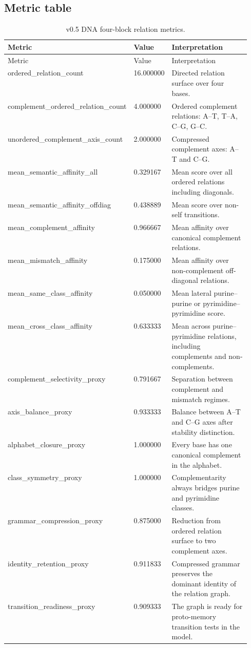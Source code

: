 \documentclass[11pt]{article}
\begin{document}
\subsection{Metric table}
\begin{longtable}{llp{0.55\linewidth}}
\caption{v0.5 DNA four-block relation metrics.}\label{tab:metrics}\\
\toprule
Metric & Value & Interpretation \\
\midrule
\endfirsthead
\toprule
Metric & Value & Interpretation \\
\midrule
\endhead
ordered\_relation\_count & 16.000000 & Directed relation surface over four bases. \\
complement\_ordered\_relation\_count & 4.000000 & Ordered complement relations: A--T, T--A, C--G, G--C. \\
unordered\_complement\_axis\_count & 2.000000 & Compressed complement axes: A--T and C--G. \\
mean\_semantic\_affinity\_all & 0.329167 & Mean score over all ordered relations including diagonals. \\
mean\_semantic\_affinity\_offdiag & 0.438889 & Mean score over non-self transitions. \\
mean\_complement\_affinity & 0.966667 & Mean affinity over canonical complement relations. \\
mean\_mismatch\_affinity & 0.175000 & Mean affinity over non-complement off-diagonal relations. \\
mean\_same\_class\_affinity & 0.050000 & Mean lateral purine--purine or pyrimidine--pyrimidine score. \\
mean\_cross\_class\_affinity & 0.633333 & Mean across purine--pyrimidine relations, including complements and non-complements. \\
complement\_selectivity\_proxy & 0.791667 & Separation between complement and mismatch regimes. \\
axis\_balance\_proxy & 0.933333 & Balance between A--T and C--G axes after stability distinction. \\
alphabet\_closure\_proxy & 1.000000 & Every base has one canonical complement in the alphabet. \\
class\_symmetry\_proxy & 1.000000 & Complementarity always bridges purine and pyrimidine classes. \\
grammar\_compression\_proxy & 0.875000 & Reduction from ordered relation surface to two complement axes. \\
identity\_retention\_proxy & 0.911833 & Compressed grammar preserves the dominant identity of the relation graph. \\
transition\_readiness\_proxy & 0.909333 & The graph is ready for proto-memory transition tests in the model. \\
\bottomrule
\end{longtable}
\end{document}
